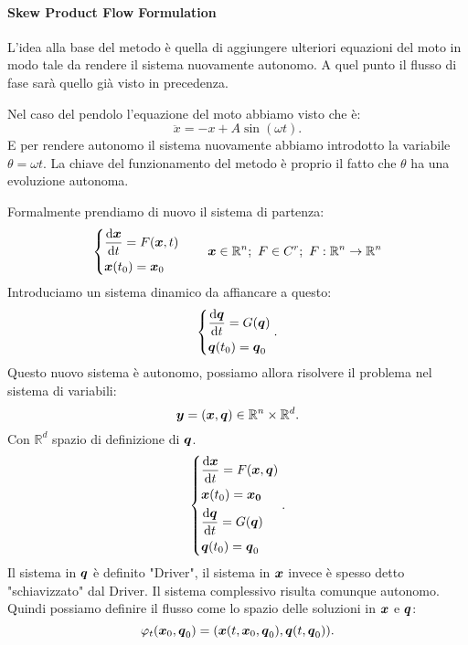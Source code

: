 \paragraph{Skew Product Flow Formulation}%
\label{par:Skew Product Flow Formulation}
L'idea alla base del metodo è quella di aggiungere ulteriori equazioni del moto in modo tale da rendere il sistema nuovamente autonomo. A quel punto il flusso di fase sarà quello già visto in precedenza.
\begin{exmp}[Pendolo]
    Nel caso del pendolo l'equazione del moto abbiamo visto che è:
    \[
	\ddot{x} = - x + A \sin (\omega t)
    .\] 
    E per rendere autonomo il sistema nuovamente abbiamo introdotto la variabile $\theta  = \omega t$. La chiave del funzionamento del metodo è proprio il fatto che $\theta$ ha una evoluzione autonoma.
\end{exmp}
\noindent
Formalmente prendiamo di nuovo il sistema di partenza:
\[
    \begin{dcases}
	\frac{\text{d} \boldsymbol{x}}{\text{d} t} = F(\boldsymbol{x}, t)\\
	\boldsymbol{x}(t_0) = \boldsymbol{x}_0
    \end{dcases}
    \qquad 
    \boldsymbol{x} \in \mathbb{R}^n; \ F \in C^r; \ F: \mathbb{R}^n\to \mathbb{R}^n
\]
Introduciamo un sistema dinamico da affiancare a questo:
\[
    \begin{dcases}
	\frac{\text{d} \boldsymbol{q}}{\text{d} t} = G(\boldsymbol{q})\\
	\boldsymbol{q} (t_0)= \boldsymbol{q}_0
    \end{dcases}
.\] 
Questo nuovo sistema è autonomo, possiamo allora risolvere il problema nel sistema di variabili:
\[
    \boldsymbol{y} =(\boldsymbol{x}, \boldsymbol{q}) \in \mathbb{R}^n \times \mathbb{R}^d
.\] 
Con $\mathbb{R}^d$ spazio di definizione di $\boldsymbol{q}$.
\[
    \begin{dcases}
	\frac{\text{d} \boldsymbol{x}}{\text{d} t} = F(\boldsymbol{x}, \boldsymbol{q})\\
	\boldsymbol{x} (t_0)=\boldsymbol{x_0}\\
	\frac{\text{d} \boldsymbol{q}}{\text{d} t} = G(\boldsymbol{q})\\
	\boldsymbol{q} (t_0)=\boldsymbol{q}_0
    \end{dcases}
.\] 
Il sistema in $\boldsymbol{q}$ è definito "Driver", il sistema in $\boldsymbol{x}$ invece è spesso detto "schiavizzato" dal Driver. Il sistema complessivo risulta comunque autonomo.\\
Quindi possiamo definire il flusso come lo spazio delle soluzioni in $\boldsymbol{x}$ e $\boldsymbol{q}$:
\[
    \varphi_t(\boldsymbol{x}_0, \boldsymbol{q}_0) = (\boldsymbol{x} (t, \boldsymbol{x}_0, \boldsymbol{q}_0), \boldsymbol{q} (t, \boldsymbol{q}_0))
.\] 
